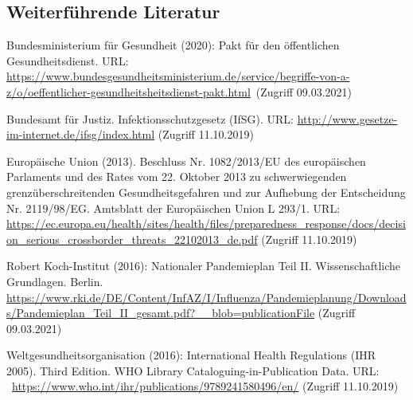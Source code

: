 \documentclass{article}
\begin{document}
\subsection{Weiterführende Literatur}\label{H6094256}



Bundesministerium für Gesundheit (2020): Pakt für den öffentlichen Gesundheitsdienst. URL: \href{https://www.bundesgesundheitsministerium.de/service/begriffe-von-a-z/o/oeffentlicher-gesundheitsheitsdienst-pakt.html}{https://www.bundesgesundheitsministerium.de/service/begriffe-von-a-z/o/oeffentlicher-gesundheitsheitsdienst-pakt.html} (Zugriff 09.03.2021)


Bundesamt für Justiz. Infektionsschutzgesetz (IfSG). URL: \href{http://www.gesetze-im-internet.de/ifsg/index.html}{http://www.gesetze-im-internet.de/ifsg/index.html} (Zugriff 11.10.2019)


Europäische Union (2013). Beschluss Nr. 1082/2013/EU des europäischen Parlaments und des Rates vom 22. Oktober 2013 zu schwerwiegenden grenzüberschreitenden Gesundheitsgefahren und zur Aufhebung der Entscheidung Nr. 2119/98/EG. Amtsblatt der Europäischen Union L 293/1. URL: \href{https://ec.europa.eu/health/sites/health/files/preparedness_response/docs/decision_serious_crossborder_threats_22102013_de.pdf}{https://ec.europa.eu/health/sites/health/files/preparedness\_response/docs/decision\_serious\_crossborder\_threats\_22102013\_de.pdf} (Zugriff 11.10.2019)


Robert Koch-Institut (2016): Nationaler Pandemieplan Teil II. Wissenschaftliche Grundlagen. Berlin. \href{https://www.rki.de/DE/Content/InfAZ/I/Influenza/Pandemieplanung/Downloads/Pandemieplan_Teil_II_gesamt.pdf?__blob=publicationFile}{https://www.rki.de/DE/Content/InfAZ/I/Influenza/Pandemieplanung/Downloads/Pandemieplan\_Teil\_II\_gesamt.pdf?\_\_blob=publicationFile} (Zugriff 09.03.2021)


Weltgesundheitsorganisation (2016): International Health Regulations (IHR 2005). Third Edition. WHO Library Cataloguing-in-Publication Data. URL:  \href{https://www.who.int/ihr/publications/9789241580496/en/}{https://www.who.int/ihr/publications/9789241580496/en/} (Zugriff 11.10.2019)
\end{document}

